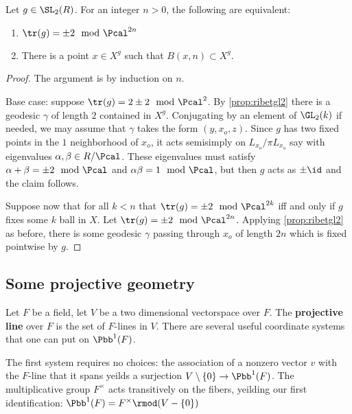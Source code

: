 \documentclass{amsart}
\begin{document}
	
	\begin{prop}
		Let $g\in \SL_{2}(R)$. For an integer $n >0$, the following are equivalent:
		\begin{enumerate}
			\item $\tr(g) = \pm 2 \mod \Pcal^{2n}$
			\item There is a point $x \in X^{g}$ such that $B(x,n)\subset X^{g}$.
		\end{enumerate}
	\end{prop}
	\begin{proof}
		The argument is by induction on $n$.
		
		Base case: suppose $\tr(g)=2 \pm 2 \mod \Pcal^{2}$. By \cref{prop:ribetgl2} there is a geodesic $\gamma$ of length $2$ contained in $X^{g}$.  Conjugating by an element of $\GL_{2}(k)$ if needed, we may assume that $\gamma$ takes the form $(y, x_{o},z)$. Since $g$ has two fixed points in the $1$ neighborhood of $x_{o}$, it acts semisimply on $L_{x_o}/\pi L_{x_{o}}$ say with eigenvalues $\alpha,\beta \in R/\Pcal$. These eigenvalues must satisfy $\alpha + \beta =\pm 2 \mod \Pcal$ and $\alpha \beta = 1  \mod \Pcal$, but then $g$ acts as $\pm \id$ and the claim follows.
		
		Suppose now that for all $k<n$ that $\tr(g) = \pm 2 \mod \Pcal^{2k}$ iff and only if $g$ fixes some $k$ ball in $X$. Let $\tr(g) = \pm 2 \mod \Pcal^{2n}$. Applying \cref{prop:ribetgl2}  as before, there is some geodesic $\gamma$ passing through $x_{o}$ of length $2n$ which is fixed pointwise by $g$.
		
		
	\end{proof}
	
	
	\subsection{Some projective geometry}
	Let $F$ be a field, let $V$ be a two dimensional vectorspace over $F$. The \textbf{projective line} over $F$ is the set of $F$-lines in $V$. There are several useful coordinate systems that one can put on $\Pbb^{1}(F)$.
	
	The first system requires no choices: the association of a nonzero vector $v$ with the $F$-line that it spans yeilds a surjection $V\setminus \{0\} \to \Pbb^{1}(F)$. The multiplicative group $F^{\times}$ acts transitively on the fibers, yeilding our first identification: $\Pbb^{1}(F) = F^{\times}\rmod (V - \{0\})$
	
\end{document}
